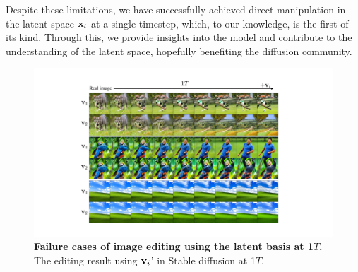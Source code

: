 
Despite these limitations, we have successfully achieved direct manipulation in the latent space $\mathbf{x}_t$ at a single timestep, which, to our knowledge, is the first of its kind. Through this, we provide insights into the model and contribute to the understanding of the latent space, hopefully benefiting the diffusion community.

\begin{figure}[!h]
    \centering
    \includegraphics[width=0.8\linewidth]{figure/stable_1T.pdf}
    \caption{
    \textbf{Failure cases of image editing using the latent basis at 1$T$.} The editing result using $\mathbf{v}_i$' in Stable diffusion at 1$T$.}
    \label{fig:stable_1T}
\end{figure}

